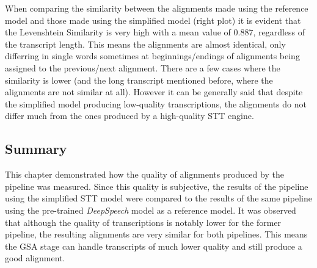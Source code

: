 When comparing the similarity between the alignments made using the reference model and those made using the simplified model (right plot) it is evident that the Levenshtein Similarity is very high with a mean value of $0.887$, regardless of the transcript length. This means the alignments are almost identical, only differring in single words sometimes at beginnings/endings of alignments being assigned to the previous/next alignment. There are a few cases where the similarity is lower (and the long transcript mentioned before, where the alignments are not similar at all). However it can be generally said that despite the simplified model producing low-quality transcriptions, the alignments do not differ much from the ones produced by a high-quality \ac{STT} engine.

\subsection{Summary}

This chapter demonstrated how the quality of alignments produced by the pipeline was measured. Since this quality is subjective, the results of the pipeline using the simplified \ac{STT} model were compared to the results of the same pipeline using the pre-trained \textit{DeepSpeech} model as a reference model. It was observed that although the quality of transcriptions is notably lower for the former pipeline, the resulting alignments are very similar for both pipelines. This means the \ac{GSA} stage can handle transcripts of much lower quality and still produce a good alignment.